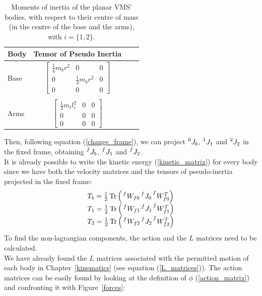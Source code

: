 \documentclass[a4paper,12pt,oneside]{report}
\DeclareMathOperator{\Tr}{Tr}
\begin{document}
\begin{table}
  \caption{Moments of inertia of the planar VMS' bodies, with respect to their centre of mass (in the centre of the base and the arms), with $i=\{1,2\}$.}
  \label{pseudo_moments_table}
  \begin{center}
  \begin{tabular}{lccc}
    \toprule
  \textbf{Body} & \textbf{Tensor of Pseudo Inertia}\\
  \midrule
  Base&$\begin{bmatrix}
    \frac{1}{4}m_br^2&0&0\\
    0&\frac{1}{4}m_br^2&0\\
    0&0&0
  \end{bmatrix}$\\
  \\
  Arms&$\begin{bmatrix}
    \frac{1}{3}m_il_i^2&0&0\\
    0&0&0\\
    0&0&0
  \end{bmatrix}$\\
  \bottomrule
  \end{tabular}
  \end{center}
  \end{table}
Then, following equation (\ref{change_frame}), we can project $\prescript{0}{}{J_b}$, $\prescript{1}{}{J_1}$ and $\prescript{2}{}{J_2}$ in the fixed frame, obtaining $\prescript{f}{}{J_b}$, $\prescript{f}{}{J_1}$ and $\prescript{f}{}{J_2}$.\\
It is already possible to write the kinetic energy (\ref{kinetic_matrix}) for every body since we have both the velocity matrices and the tensors of pseudo-inertia projected in the fixed frame:
\begin{equation}
  \begin{array}{l}
    T_b=\frac{1}{2}\Tr{\Big(\prescript{f}{}{W_{f0}}\prescript{f}{}{J_0}\prescript{f}{}{W_{f0}^T}\Big)}\\
    T_1=\frac{1}{2}\Tr{\Big(\prescript{f}{}{W_{f1}}\prescript{f}{}{J_1}\prescript{f}{}{W_{f1}^T}\Big)}\\
    T_2=\frac{1}{2}\Tr{\Big(\prescript{f}{}{W_{f2}}\prescript{f}{}{J_2}\prescript{f}{}{W_{f2}^T}\Big)}
  \end{array}
\end{equation}
To find the non-lagrangian components, the action and the $L$ matrices need to be calculated.\\
We have already found the $L$ matrices associated with the permitted motion of each body in Chapter~\ref{kinematics} (see equation (\ref{L_matrices})). The action matrices can be easily found by looking at the definition of $\phi$ (\ref{action_matrix}) and confronting it with Figure~\ref{forces}:
\end{document}
